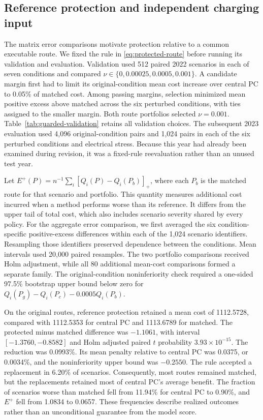\subsection{Reference protection and independent charging input}
\label{sec:reference-protection}

The matrix error comparisons motivate protection relative to a common
executable route.  We fixed the rule in \eqref{eq:protected-route} before
running its validation and evaluation.  Validation used 512 paired 2022
scenarios in each of seven conditions and compared
$\nu\in\{0,0.00025,0.0005,0.001\}$.  A candidate margin first had to limit
its original-condition mean cost increase over central PC to 0.05\% of
matched cost.  Among passing margins, selection minimized mean positive
excess above matched across the six perturbed conditions, with ties assigned
to the smaller margin.  Both route portfolios selected $\nu=0.001$.
Table~\ref{tab:guarded-validation} retains all validation choices.
The subsequent 2023 evaluation used 4,096 original-condition pairs and
1,024 pairs in each of the six perturbed conditions and electrical stress.
Because this year had already been examined during revision, it was a
fixed-rule reevaluation rather than an unused test year.

Let $E^+(P)=n^{-1}\sum_i[Q_i(P)-Q_i(P_b)]_+$, where each $P_b$ is the
matched route for that scenario and portfolio.  This quantity measures
additional cost incurred when a method performs worse than its reference.
It differs from the upper tail of total cost, which also includes scenario
severity shared by every policy.  For the aggregate error comparison, we
first averaged the six condition-specific positive-excess differences
within each of the 1,024 scenario identifiers.  Resampling those identifiers
preserved dependence between the conditions.  Mean intervals used 20,000
paired resamples.  The two portfolio comparisons received Holm adjustment,
while all 80 additional mean-cost comparisons formed a separate family.
The original-condition noninferiority check required a one-sided 97.5\%
bootstrap upper bound below zero for
$Q_i(P_g)-Q_i(P_c)-0.0005Q_i(P_b)$.



On the original routes, reference protection retained a mean cost of
1112.5728, compared with 1112.5353 for central PC and 1113.6789 for matched.
The protected minus matched difference was $-1.1061$, with interval
$[-1.3760,-0.8582]$ and Holm adjusted paired $t$ probability
$3.93\times10^{-15}$.  The reduction was 0.0993\%.  Its mean penalty relative
to central PC was 0.0375, or 0.0034\%, and the noninferiority upper bound
was $-0.2550$.  The rule accepted a replacement in 6.20\% of scenarios.
Consequently, most routes remained matched, but the replacements retained
most of central PC's average benefit.  The fraction of scenarios worse than
matched fell from 11.94\% for central PC to 0.90\%, and $E^+$ fell from
1.0834 to 0.0657.  These frequencies describe realized outcomes rather than
an unconditional guarantee from the model score.

